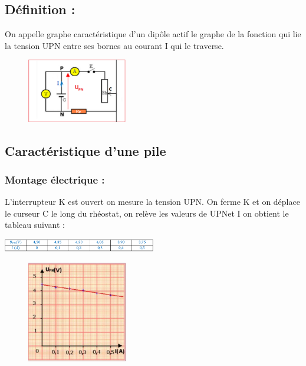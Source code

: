 \documentclass[12pt]{article}
\begin{document}
\subsection{ Définition :}
On appelle graphe caractéristique d’un dipôle actif le graphe de la fonction qui lie la tension UPN entre ses bornes au courant I qui le traverse.
\begin{figure}
\begin{center}
\includegraphics[width=0.39\textwidth]{./img/Pile_use.png}
\end{center}
\end{figure}

\subsection{Caractéristique d’une pile}
\subsubsection{Montage électrique :}
L’interrupteur K est ouvert on mesure la tension UPN.
On ferme K et on déplace le curseur C le long du
rhéostat, on relève les valeurs de UPNet I on obtient le
tableau suivant :

\includegraphics[width=0.5\textwidth]{./img/table.png}

\begin{figure}
\begin{center}
  \vspace{-1.7cm}
  \includegraphics[width=0.39\textwidth]{./img/tension_courant.png}
\end{center}
\end{figure}
\end{document}
